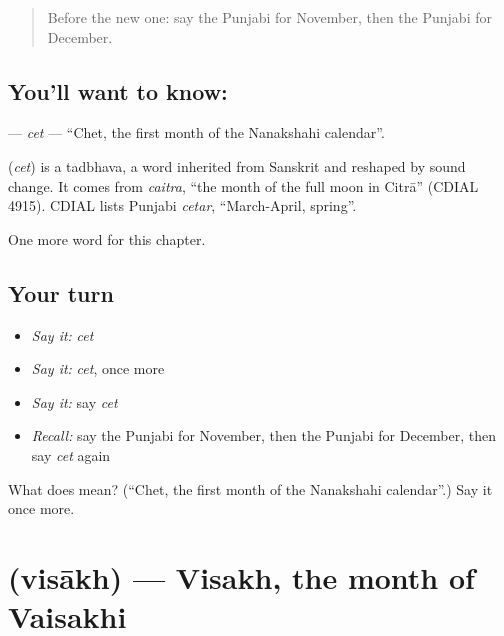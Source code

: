 \label{lesson:PA-C103-cet}



\begin{quote}
Before the new one: say the Punjabi for November, then the Punjabi for December.
\end{quote}

\subsection*{You'll want to know: }
\textbf{} — \emph{cet} — \textquotedblleft{}Chet, the first month of the Nanakshahi calendar\textquotedblright{}.

\begin{cousinweb}
\textbf{} (\emph{cet}) is a tadbhava, a word inherited from Sanskrit and reshaped by sound change. It comes from \emph{caitra}, \textquotedblleft{}the month of the full moon in Citrā\textquotedblright{} (CDIAL 4915). CDIAL lists Punjabi \emph{cetar}, \textquotedblleft{}March-April, spring\textquotedblright{}.
\end{cousinweb}

\begin{grammarlens}[title={What you've built}]
One more word for this chapter.
\end{grammarlens}

\subsection*{Your turn}
\begin{itemize}
\raggedright
  \item \emph{Say it:} \emph{cet}
  \item \emph{Say it:} \emph{cet}, once more
  \item \emph{Say it:} say \emph{cet}
  \item \emph{Recall:} say the Punjabi for November, then the Punjabi for December, then say \emph{cet} again
\end{itemize}

\begin{tcolorbox}[breakable,colback=teal!4,colframe=teal!35!black,title={Before you move on}]
What does  mean? (\textquotedblleft{}Chet, the first month of the Nanakshahi calendar\textquotedblright{}.) Say it once more.
\end{tcolorbox}
\section[\texorpdfstring{\pa{ਵਿਸਾਖ} (visākh)}{ਵਿਸਾਖ (visākh)}]{ (visākh) — Visakh, the month of Vaisakhi}

